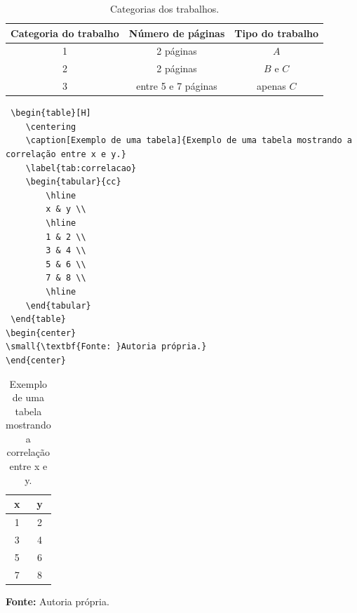 \documentclass{modelo}
\begin{document}
   
\begin{table}[H]
 \caption{ {\small Categorias dos trabalhos.}}
 \begin{center}
 \begin{tabular}{|c|c|c|}
  \hline  
   Categoria do trabalho  & Número de páginas & Tipo do trabalho\\
  \hline
   1          & 2 páginas & $A$   \\
  \hline
   2          & 2 páginas & $B$ e $C$ \\
  \hline
   3          & entre 5 e 7 páginas & apenas $C$ \\
  \hline
 \end{tabular} 
 \label{tabela01}
 \end{center} 
\end{table} 


\begin{verbatim}
 \begin{table}[H]
 	\centering
 	\caption[Exemplo de uma tabela]{Exemplo de uma tabela mostrando a correlação entre x e y.}
 	\label{tab:correlacao}
 	\begin{tabular}{cc}
 		\hline
 		x & y \\
 		\hline
 		1 & 2 \\
 		3 & 4 \\
 		5 & 6 \\
 		7 & 8 \\
 		\hline
 	\end{tabular}
 \end{table}
\begin{center}
\small{\textbf{Fonte: }Autoria própria.}
\end{center}   
\end{verbatim}    
 \begin{table}[H]
	\centering
	\caption[Exemplo de uma tabela]{Exemplo de uma tabela mostrando a correlação entre x e y.}
	\label{tab:correlacao}
	\begin{tabular}{cc}
		\hline
		x & y \\
		\hline
		1 & 2 \\
		3 & 4 \\
		5 & 6 \\
		7 & 8 \\
		\hline
	\end{tabular}
\end{table}
\begin{center}
	\small{\textbf{Fonte: }Autoria própria.}
\end{center}
    
\end{document}
